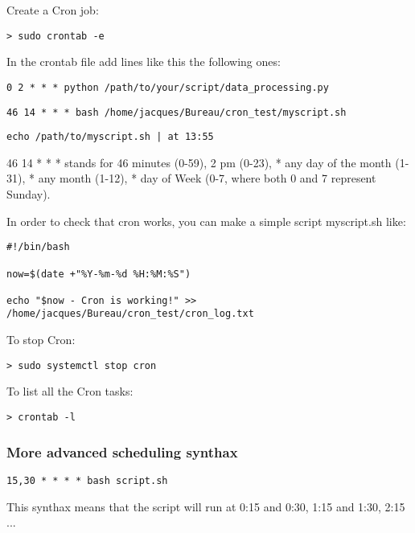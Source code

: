 \documentclass[24pt]{article}
\begin{document}
Create a Cron job:

\begin{lstlisting}
> sudo crontab -e
\end{lstlisting}


In the crontab file add lines like this the following ones:

\begin{lstlisting}
0 2 * * * python /path/to/your/script/data_processing.py
\end{lstlisting}  
  
\begin{lstlisting}
46 14 * * * bash /home/jacques/Bureau/cron_test/myscript.sh
\end{lstlisting}  
  
\begin{lstlisting}  
echo /path/to/myscript.sh | at 13:55
\end{lstlisting}  
  
  
46 14 * * * stands for 46 minutes (0-59), 2 pm (0-23), * any day of the month (1-31), * any month (1-12), * day of Week (0-7, where both 0 and 7 represent Sunday). 

In order to check that cron works, you can make a simple script myscript.sh like:

\begin{lstlisting}
#!/bin/bash

now=$(date +"%Y-%m-%d %H:%M:%S")

echo "$now - Cron is working!" >> /home/jacques/Bureau/cron_test/cron_log.txt
\end{lstlisting}


To stop Cron: 
\begin{lstlisting}
> sudo systemctl stop cron
\end{lstlisting}

To list all the Cron tasks: 
\begin{lstlisting}
> crontab -l
\end{lstlisting}




\subsubsection{More advanced scheduling synthax}

\begin{lstlisting}
15,30 * * * * bash script.sh
\end{lstlisting}
This synthax means that the script will run at 0:15 and 0:30, 1:15 and 1:30, 2:15 ...
\end{document}
